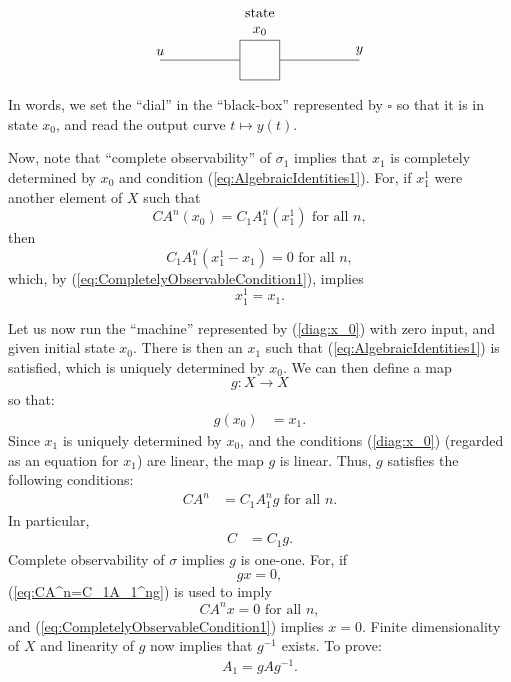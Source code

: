 \documentclass[12pt]{book}
\theoremstyle{plain}
\theoremstyle{definition}
\begin{document}
\begin{equation}
\begin{tikzpicture} \label{diag:x_0}
    \node[draw, rectangle, minimum width=1cm, minimum height=1cm] (box) at (0,0) {};
    \node[above] (x0) at (box.north) {$x_0$};
    \node[above] at (x0.north) {state};
    \draw (box.west) -- ++(-2,0) node[above]{$u$};
    \draw (box.east) -- ++(2,0) node[above]{$y$};
\end{tikzpicture}
\end{equation}

In words, we set the ``dial'' in the ``black-box'' represented by $\square$ so that it is in state $x_0$, and read the output curve $t \mapsto y(t)$.

Now, note that ``complete observability'' of $\sigma_1$ implies that $x_1$ is completely determined by $x_0$ and condition (\ref{eq:AlgebraicIdentities1}).
For, if $x_1^1$ were another element of $X$ such that
$$CA^n(x_0) = C_1A_1^n(x_1^1) \text{ for all } n,$$
then
$$C_1A_1^n(x_1^1-x_1) = 0 \text{ for all } n,$$
which, by (\ref{eq:CompletelyObservableCondition1}), implies
$$x_1^1 = x_1.$$

Let us now run the ``machine'' represented by (\ref{diag:x_0}) with zero input, and given initial state $x_0$.
There is then an $x_1$ such that (\ref{eq:AlgebraicIdentities1}) is satisfied, which is uniquely determined by $x_0$. We can then define a map
$$g: X \to X$$
so that:
\begin{align} \label{eq:g(x_0)=x_1}
    g(x_0) &= x_1.
\end{align}
Since $x_1$ is uniquely determined by $x_0$, and the conditions (\ref{diag:x_0}) (regarded as an equation for $x_1$) are linear, the map $g$ is linear. %
Thus, $g$ satisfies the following conditions:
\begin{align} \label{eq:CA^n=C_1A_1^ng}
    CA^n &= C_1A_1^ng \text{ for all } n.
\end{align}
In particular,
\begin{align} \label{eq:C=C_1g}
    C &= C_1g.
\end{align}
Complete observability of $\sigma$ implies $g$ is one-one.
For, if
$$gx = 0,$$
(\ref{eq:CA^n=C_1A_1^ng}) is used to imply
$$CA^nx = 0 \text{ for all } n,$$
and (\ref{eq:CompletelyObservableCondition1}) implies $x = 0$.
Finite dimensionality of $X$ and linearity of $g$ now implies that $g^{-1}$ exists.
To prove:
\begin{align} \label{eq:A_1=gAg^(-1)}
    A_1 = gAg^{-1}.
\end{align}
\end{document}

